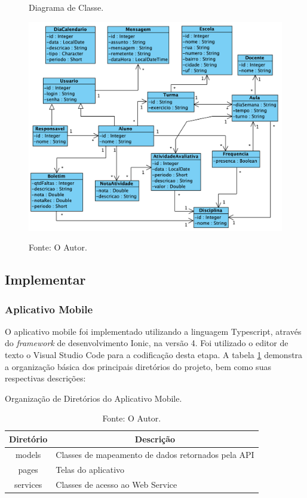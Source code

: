 \begin{figure}[H]
	\caption{Diagrama de Classe.}
	\centering %
	\includegraphics[width=16cm]{resources/classes_projeto.png} %
	\label{figura:diagrama_classe}
	\captionsetup{singlelinecheck = false, format= hang, justification=raggedright, labelsep=space, width=16cm}
	\caption*{\footnotesize Fonte: O Autor.}
\end{figure}

\subsection{Implementar}

\subsubsection{Aplicativo Mobile}

O aplicativo mobile foi implementado utilizando a linguagem Typescript, através do \textit{framework} de desenvolvimento Ionic, na versão 4. Foi utilizado o editor de texto o Visual Studio Code para a codificação desta etapa. A tabela \ref{tabela:app_organizacao} demonstra a organização básica dos principais diretórios do projeto, bem como suas respectivas descrições: 

\renewcommand{\arraystretch}{1.5}
\begin{table}[H]
    \small
	\centering
	\caption{Organização de Diretórios do Aplicativo Mobile.}
	\label{tabela:app_organizacao}
	\begin{tabular}{c l}
	    \hline
		\multicolumn{1}{l|}{\textbf{Diretório}} & \multicolumn{1}{c}{\textbf{Descrição}}\\
		\hline
		models & Classes de mapeamento de dados retornados pela API  \\
		pages & Telas do aplicativo \\
		services & Classes de acesso ao Web Service \\
		\hline
	\end{tabular}
	\captionsetup{singlelinecheck = false, format= hang, justification=raggedright, labelsep=space, width=11.9cm}
	\caption*{\footnotesize Fonte: O Autor.}
\end{table}
\renewcommand{\arraystretch}{1}

